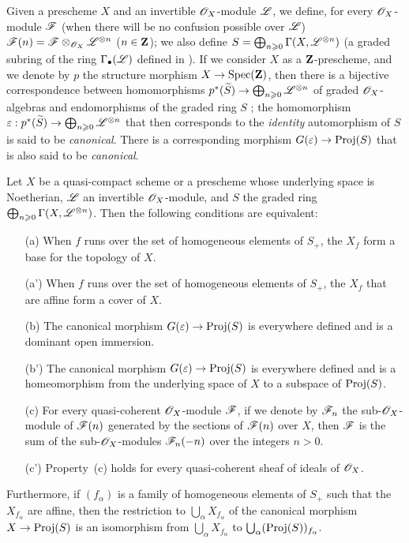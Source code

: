 \begin{env}[4.5.1]
\label{II.4.5.1}
Given a prescheme $X$ and an invertible $\mathscr{O}_X$-module $\mathscr{L}$, we define, for every $\mathscr{O}_X$-module $\mathscr{F}$ (when there will be no confusion possible over $\mathscr{L}$) $\mathscr{F}(n)=\mathscr{F}\otimes_{\mathscr{O}_X}\mathscr{L}^{\otimes n}$ ($n\in\mathbf{Z}$);
we also define $S=\bigoplus_{n\geqslant0}\Gamma(X,\mathscr{L}^{\otimes n})$ (a graded subring of the ring $\Gamma_\bullet(\mathscr{L})$ defined in ).
If we consider $X$ as a $\mathbf{Z}$-prescheme, and we denote by $p$ the structure morphism $X\to\Spec(\bb{Z})$, then there is a bijective correspondence between homomorphisms $p^*(\widetilde{S})\to\bigoplus_{n\geq0}\sh{L}^{\otimes n}$ of graded $\mathscr{O}_X$-algebras and endomorphisms of the graded ring $S$ ;
the homomorphism $\varepsilon:p^*(\widetilde{S})\to\bigoplus_{n\geq0}\sh{L}^{\otimes n}$ that then corresponds to the \emph{identity} automorphism of $S$ is said to be \emph{canonical}.
There is a corresponding  morphism $G(\varepsilon)\to\Proj(S)$ that is also said to be \emph{canonical}.
\end{env}

\begin{theorem}[4.5.2]
\label{II.4.5.2}
Let $X$ be a quasi-compact scheme or a prescheme whose underlying space is Noetherian, $\mathscr{L}$ an invertible $\mathscr{O}_X$-module, and $S$ the graded ring $\bigoplus_{n\geqslant0}\Gamma(X,\mathscr{L}^{\otimes n})$.
Then the following conditions are equivalent:
\begin{enumerate}
  \item[\rm{(a)}] When $f$ runs over the set of homogeneous elements of $S_+$, the $X_f$ form a base for the topology of $X$.
  \item[\rm{(a')}] When $f$ runs over the set of homogeneous elements of $S_+$, the $X_f$ that are affine form a cover of $X$.
  \item[\rm{(b)}] The canonical morphism $G(\varepsilon)\to\Proj(S)$  is everywhere defined and is a dominant open immersion.
  \item[\rm{(b')}] The canonical morphism $G(\varepsilon)\to\Proj(S)$ is everywhere defined and is a homeomorphism from the underlying space of $X$ to a subspace of $\operatorname{Proj}(S)$.
  \item[\rm{(c)}] For every quasi-coherent $\mathscr{O}_X$-module $\mathscr{F}$, if we denote by $\mathscr{F}_n$ the sub-$\mathscr{O}_X$-module of $\mathscr{F}(n)$ generated by the sections of $\mathscr{F}(n)$ over $X$, then $\mathscr{F}$ is the sum of the sub-$\mathscr{O}_X$-modules $\mathscr{F}_n(-n)$ over the integers $n>0$.
  \item[\rm{(c')}] Property~\rm{(c)} holds for every quasi-coherent sheaf of ideals of $\mathscr{O}_X$.
\end{enumerate}

Furthermore, if $(f_\alpha)$ is a family of homogeneous elements of $S_+$ such that the $X_{f_\alpha}$ are affine, then the restriction to $\bigcup_\alpha X_{f_\alpha}$ of the canonical morphism $X\to\Proj(S)$ is an isomorphism from $\bigcup_\alpha X_{f_\alpha}$ to $\bigcup_\alpha(\operatorname{Proj}(S))_{f_\alpha}$.
\end{theorem}

